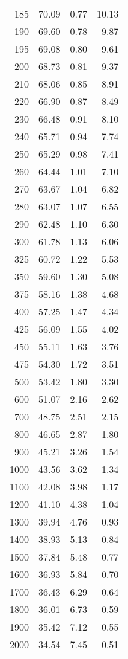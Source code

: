 \begin{table}[ht]
\begin{tabular}{rrrr}
   185 & 70.09 & 0.77 & 10.13 \\ 
   190 & 69.60 & 0.78 & 9.87 \\ 
   195 & 69.08 & 0.80 & 9.61 \\ 
   200 & 68.73 & 0.81 & 9.37 \\ 
   210 & 68.06 & 0.85 & 8.91 \\ 
   220 & 66.90 & 0.87 & 8.49 \\ 
   230 & 66.48 & 0.91 & 8.10 \\ 
   240 & 65.71 & 0.94 & 7.74 \\ 
   250 & 65.29 & 0.98 & 7.41 \\ 
   260 & 64.44 & 1.01 & 7.10 \\ 
   270 & 63.67 & 1.04 & 6.82 \\ 
   280 & 63.07 & 1.07 & 6.55 \\ 
   290 & 62.48 & 1.10 & 6.30 \\ 
   300 & 61.78 & 1.13 & 6.06 \\ 
   325 & 60.72 & 1.22 & 5.53 \\ 
   350 & 59.60 & 1.30 & 5.08 \\ 
   375 & 58.16 & 1.38 & 4.68 \\ 
   400 & 57.25 & 1.47 & 4.34 \\ 
   425 & 56.09 & 1.55 & 4.02 \\ 
   450 & 55.11 & 1.63 & 3.76 \\ 
   475 & 54.30 & 1.72 & 3.51 \\ 
   500 & 53.42 & 1.80 & 3.30 \\ 
   600 & 51.07 & 2.16 & 2.62 \\ 
   700 & 48.75 & 2.51 & 2.15 \\ 
   800 & 46.65 & 2.87 & 1.80 \\ 
   900 & 45.21 & 3.26 & 1.54 \\ 
  1000 & 43.56 & 3.62 & 1.34 \\ 
  1100 & 42.08 & 3.98 & 1.17 \\ 
  1200 & 41.10 & 4.38 & 1.04 \\ 
  1300 & 39.94 & 4.76 & 0.93 \\ 
  1400 & 38.93 & 5.13 & 0.84 \\ 
  1500 & 37.84 & 5.48 & 0.77 \\ 
  1600 & 36.93 & 5.84 & 0.70 \\ 
  1700 & 36.43 & 6.29 & 0.64 \\ 
  1800 & 36.01 & 6.73 & 0.59 \\ 
  1900 & 35.42 & 7.12 & 0.55 \\ 
  2000 & 34.54 & 7.45 & 0.51 \\ 
   \hline
\end{tabular}
\end{table}
